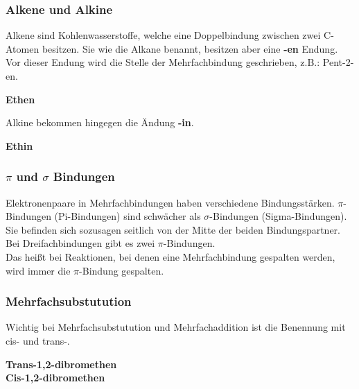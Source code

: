 \documentclass[a4paper]{report}
\begin{document}
\subsubsection{Alkene und Alkine}

Alkene sind Kohlenwasserstoffe, welche eine Doppelbindung zwischen zwei C-Atomen besitzen.
Sie wie die Alkane benannt, besitzen aber eine \textbf{-en} Endung. Vor dieser Endung wird die Stelle der Mehrfachbindung geschrieben,
z.B.: Pent-2-en.\\

\begin{center}
     \hspace{1cm} \textbf{Ethen}\\[0,5cm]
\end{center}


Alkine bekommen hingegen die Ändung \textbf{-in}.\\

\begin{center}
     \hspace{1cm} \textbf{Ethin}\\[0,5cm]
\end{center}


\subsubsection{$\pi$ und $\sigma$ Bindungen}

Elektronenpaare in Mehrfachbindungen haben verschiedene Bindungsstärken. $\pi$-Bindungen (Pi-Bindungen) sind schwächer als $\sigma$-Bindungen (Sigma-Bindungen).
Sie befinden sich sozusagen seitlich von der Mitte der beiden Bindungspartner. Bei Dreifachbindungen gibt es zwei $\pi$-Bindungen.\\
Das heißt bei Reaktionen, bei denen eine Mehrfachbindung gespalten werden, wird immer die $\pi$-Bindung gespalten.



\subsubsection{Mehrfachsubstutution}

Wichtig bei Mehrfachsubstutution und Mehrfachaddition ist die Benennung mit cis- und trans-.\\
\begin{center}
     \hspace{1cm} \textbf{Trans-1,2-dibromethen}\\[0,5cm]
     \hspace{1cm} \textbf{Cis-1,2-dibromethen}\\[0,5cm]
\end{center}
\end{document}
